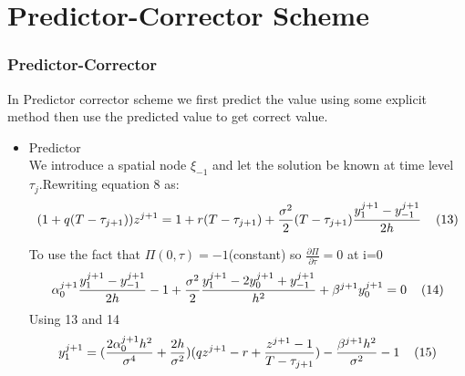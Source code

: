 \documentclass{beamer}
\begin{document}
\section{Predictor-Corrector Scheme}

\begin{frame}
\frametitle{Predictor-Corrector}
In Predictor corrector scheme we first predict the value using some explicit method then use the predicted value to get correct value.

\begin{itemize}
    \item<1-> Predictor\\
   We introduce a spatial node $\xi_{-1}$ and let the solution be known at time level $\tau_{j}$.Rewriting equation 8 as:
    \[(1+q(T-\tau_{j+1}))z^{j+1}=1+r(T-\tau_{j+1})+\frac{\sigma^2}{2}(T-\tau_{j+1})\frac{y_{1}^{j+1}-y_{-1}^{j+1}}{2h}    \hspace{4mm}(13)\] 
   
     To use the fact that $\Pi(0,\tau)=-1$(constant) so $\frac{\partial \Pi}{\partial \tau}=0$ at i=0 
      \[\alpha_{0}^{j+1}\frac{y_{1}^{j+1}-y_{-1}^{j+1}}{2h}-1+\frac{\sigma^2}{2}\frac{y_{1}^{j+1}-2y_{0}^{j+1}+y_{-1}^{j+1}}{h^2}+\beta^{j+1}y_{0}^{j+1}=0    \hspace{4mm}(14)\] 
      Using 13 and 14
      \[y_{1}^{j+1}=(\frac{2\alpha_{0}^{j+1}h^2}{\sigma^4}+\frac{2h}{\sigma^2})(qz^{j+1}-r+\frac{z^{j+1}-1}{T-\tau_{j+1}})-\frac{\beta^{j+1}h^2}{\sigma^2}-1   \hspace{4mm}(15)\]
   
\end{itemize}
\end{frame}

\end{document}
